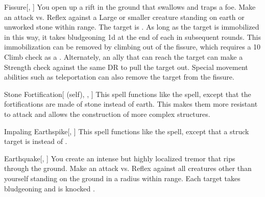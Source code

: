 \lowercase{\hypertarget{spell:Fissure}{}}\label{spell:Fissure}
\begin{ability}[\nth{3}]{\hypertarget{spell:Fissure}{Fissure}}[, ]
You open up a rift in the ground that swallows and traps a foe.
Make an attack vs. Reflex against a Large or smaller creature standing on earth or unworked stone within \rngmed range.
\hit The target is .
As long as the target is immobilized in this way,
it takes bludgeoning  \minus1d at the end of each  in subsequent rounds.
This immobilization can be removed by climbing out of the fissure, which requires a  10 Climb check as a .
Alternately, an ally that can reach the target can make a Strength check against the same DR to pull the target out.
Special movement abilities such as teleportation can also remove the target from the fissure.
\end{ability}
\vspace{0.25em}



\lowercase{\hypertarget{spell:Stone Fortification}{}}\label{spell:Stone Fortification}
\begin{ability}[\nth{3}]{\hypertarget{spell:Stone Fortification}{Stone Fortification}}[ (self), , ]
This spell functions like the  spell, except that the fortifications are made of stone instead of earth.
This makes them more resistant to attack and allows the construction of more complex structures.
\end{ability}
\vspace{0.25em}



\lowercase{\hypertarget{spell:Impaling Earthspike}{}}\label{spell:Impaling Earthspike}
\begin{ability}[\nth{4}]{\hypertarget{spell:Impaling Earthspike}{Impaling Earthspike}}[, ]
This spell functions like the  spell, except that a struck target is  instead of .
\end{ability}
\vspace{0.25em}



\lowercase{\hypertarget{spell:Earthquake}{}}\label{spell:Earthquake}
\begin{ability}[\nth{5}]{\hypertarget{spell:Earthquake}{Earthquake}}[, ]
You create an intense but highly localized tremor that rips through the ground.
Make an attack vs. Reflex against all creatures other than yourself standing on the ground in a \arealarge radius within \rngmed range.
\hit Each target takes bludgeoning  and is knocked .
\end{ability}
\vspace{0.25em}



